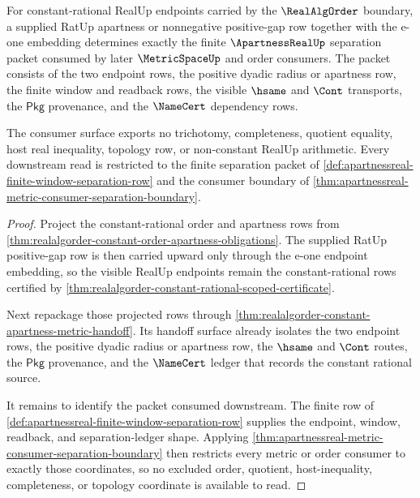 \begin{theorem}
\label{thm:realalgorder-apartness-positive-gap-order-consumer}
For constant-rational RealUp endpoints carried by the $\RealAlgOrder$
boundary, a supplied RatUp apartness or nonnegative positive-gap row together
with the e-one embedding determines exactly the finite $\ApartnessRealUp$
separation packet consumed by later $\MetricSpaceUp$ and order consumers. The
packet consists of the two endpoint rows, the positive dyadic radius or
apartness row, the finite window and readback rows, the visible $\hsame$ and
$\Cont$ transports, the $\mathsf{Pkg}$ provenance, and the $\NameCert$
dependency rows.

The consumer surface exports no trichotomy, completeness, quotient equality,
host real inequality, topology row, or non-constant RealUp arithmetic. Every
downstream read is restricted to the finite separation packet of
\autoref{def:apartnessreal-finite-window-separation-row} and the consumer
boundary of \autoref{thm:apartnessreal-metric-consumer-separation-boundary}.
\end{theorem}
\begin{proof}
Project the constant-rational order and apartness rows from
\autoref{thm:realalgorder-constant-order-apartness-obligations}. The supplied
RatUp positive-gap row is then carried upward only through the e-one endpoint
embedding, so the visible RealUp endpoints remain the constant-rational rows
certified by
\autoref{thm:realalgorder-constant-rational-scoped-certificate}.

Next repackage those projected rows through
\autoref{thm:realalgorder-constant-apartness-metric-handoff}. Its handoff
surface already isolates the two endpoint rows, the positive dyadic radius or
apartness row, the $\hsame$ and $\Cont$ routes, the $\mathsf{Pkg}$ provenance,
and the $\NameCert$ ledger that records the constant rational source.

It remains to identify the packet consumed downstream. The finite row of
\autoref{def:apartnessreal-finite-window-separation-row} supplies the endpoint,
window, readback, and separation-ledger shape. Applying
\autoref{thm:apartnessreal-metric-consumer-separation-boundary} then restricts
every metric or order consumer to exactly those coordinates, so no excluded
order, quotient, host-inequality, completeness, or topology coordinate is
available to read.
\end{proof}

